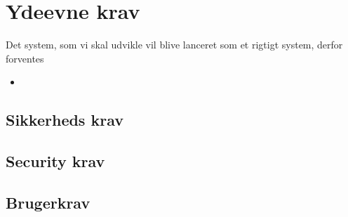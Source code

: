\section{Ydeevne krav}
Det system, som vi skal udvikle vil blive lanceret som et rigtigt system, derfor forventes  
\begin{itemize}  
     \item 
\end{itemize}

\subsection{Sikkerheds krav}

\subsection{Security krav}

\subsection{Brugerkrav}